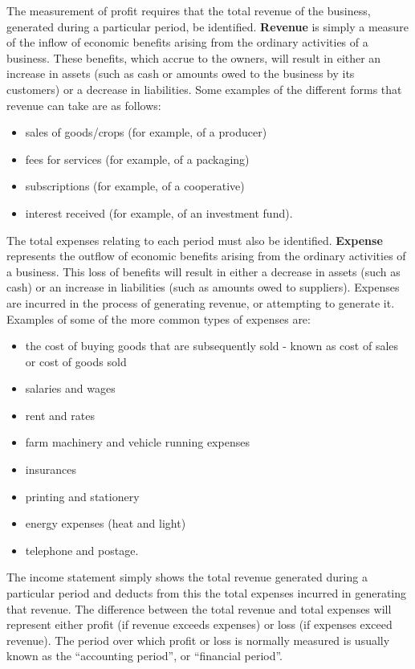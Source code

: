 \documentclass[11pt,]{book}
\providecommand{\tightlist}{%
  \setlength{\itemsep}{0pt}\setlength{\parskip}{0pt}}
\theoremstyle{definition}
\theoremstyle{definition}
\theoremstyle{definition}
\theoremstyle{remark}
\begin{document}
The measurement of profit requires that the total revenue of the
business, generated during a particular period, be identified.
\textbf{Revenue} is simply a measure of the inflow of economic benefits
arising from the ordinary activities of a business. These benefits,
which accrue to the owners, will result in either an increase in assets
(such as cash or amounts owed to the business by its customers) or a
decrease in liabilities. Some examples of the different forms that
revenue can take are as follows:

\begin{itemize}
\tightlist
\item
  sales of goods/crops (for example, of a producer)
\item
  fees for services (for example, of a packaging)
\item
  subscriptions (for example, of a cooperative)
\item
  interest received (for example, of an investment fund).
\end{itemize}

The total expenses relating to each period must also be identified.
\textbf{Expense} represents the outflow of economic benefits arising
from the ordinary activities of a business. This loss of benefits will
result in either a decrease in assets (such as cash) or an increase in
liabilities (such as amounts owed to suppliers). Expenses are incurred
in the process of generating revenue, or attempting to generate it.
Examples of some of the more common types of expenses are:

\begin{itemize}
\tightlist
\item
  the cost of buying goods that are subsequently sold - known as cost of
  sales or cost of goods sold
\item
  salaries and wages
\item
  rent and rates
\item
  farm machinery and vehicle running expenses
\item
  insurances
\item
  printing and stationery
\item
  energy expenses (heat and light)
\item
  telephone and postage.
\end{itemize}

The income statement simply shows the total revenue generated during a
particular period and deducts from this the total expenses incurred in
generating that revenue. The difference between the total revenue and
total expenses will represent either profit (if revenue exceeds
expenses) or loss (if expenses exceed revenue). The period over which
profit or loss is normally measured is usually known as the ``accounting
period'', or ``financial period''.
\end{document}
